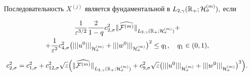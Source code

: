 \begin{theorem}[9]Последовательность $X^{(j)}$ является фундаментальной в \linebreak ${L_{2,\gamma}(\mathbb R_{+};{\cal H}^{(m)}_{\sigma})},$ если

\begin{multline}

\frac{1}{\varepsilon^{3/2}}\frac{2}{1-q}c^2_{2,\sigma}

\|\widehat{{\cal F}^{(m)}} \|_{L_{2,\gamma}(\mathbb R_{+};{\cal H}^{(m)}_{\sigma})}+

\\

+\frac{1}{\varepsilon^2}c^2_{4,\sigma}\bigl(|||u^0|||_{{\cal H}^{(m)}_\sigma}+|||w^0|||_{{\cal H}^{(m)}_\sigma}\bigr)^2\le q_1, \quad  q_1\in(0, 1),

\end{multline}

$$

c^2_{2,\sigma}=c^2_{1,\sigma}+c^2_{12,\sigma} \sqrt{\varepsilon}

\Bigl(

\|\widehat{{\cal F}^{(m)}} \|_{L_{2,\gamma}(\mathbb R_{+};{\cal H}^{(m)}_{\sigma})}+c_{9,\sigma}^2 \sqrt{\varepsilon} \bigl(|||u^0|||_{{\cal H}^{(m)}_\sigma}+|||w^0|||_{{\cal H}^{(m)}_\sigma}\bigr)^3\Bigr).

$$

\end{theorem}



\smallskip



